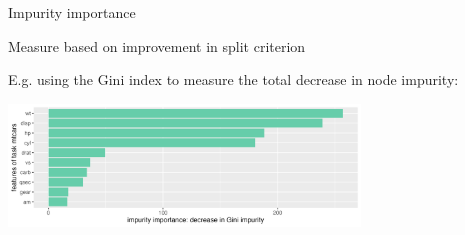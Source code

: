 \documentclass[11pt,compress,t,notes=noshow, xcolor=table]{beamer}
\begin{document}
\begin{vbframe}{Impurity importance}
\vspace{-2ex}
\begin{algorithm}[H]
\small
\caption*{Measure based on improvement in split criterion}
\begin{algorithmic}[1]
  \EndFor
  \EndFor
\end{algorithmic}
\end{algorithm}
\small
E.g. using the Gini index to measure the total decrease in node impurity:

\vspace{-1ex}

\begin{center}
\includegraphics[width=0.7\textwidth]{figure/forest-fimp_gini.png}
\end{center}

\end{vbframe}
\end{document}
